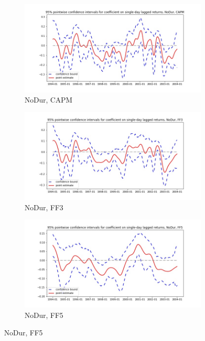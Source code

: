 \documentclass{article}
\begin{document}
  \begin{figure}
  \centering
  \begin{subfigure}[b]{0.3\textwidth}
    \centering
    \includegraphics[width=\textwidth]{NoDur/pointwiseCIs_CAPM.jpg}
    \caption{NoDur, CAPM}
    \label{fig:1}
  \end{subfigure}
  \begin{subfigure}[b]{0.3\textwidth}
    \centering
    \includegraphics[width=\textwidth]{NoDur/pointwiseCIs_FF3.jpg}
    \caption{NoDur, FF3}
    \label{fig:2}
  \end{subfigure}
    \begin{subfigure}[b]{0.3\textwidth}
    \centering
    \includegraphics[width=\textwidth]{NoDur/pointwiseCIs_FF5.jpg}
    \caption{NoDur, FF5}
    \label{fig:1}
  \end{subfigure}
  \end{figure}
  
\end{document}
